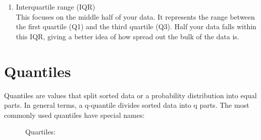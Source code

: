 \documentclass[
]{book}
\newenvironment{Shaded}{\begin{snugshade}}{\end{snugshade}}
\newcommand{\AttributeTok}[1]{\textcolor[rgb]{0.13,0.29,0.53}{#1}}
\newcommand{\CommentTok}[1]{\textcolor[rgb]{0.56,0.35,0.01}{\textit{#1}}}
\newcommand{\FunctionTok}[1]{\textcolor[rgb]{0.13,0.29,0.53}{\textbf{#1}}}
\newcommand{\NormalTok}[1]{#1}
\newcommand{\SpecialCharTok}[1]{\textcolor[rgb]{0.81,0.36,0.00}{\textbf{#1}}}
\newcommand{\StringTok}[1]{\textcolor[rgb]{0.31,0.60,0.02}{#1}}
\providecommand{\tightlist}{%
  \setlength{\itemsep}{0pt}\setlength{\parskip}{0pt}}
\begin{document}
\begin{Shaded}
\end{Shaded}

\begin{enumerate}
\def\labelenumi{\arabic{enumi}.}
\setcounter{enumi}{3}
\tightlist
\item
  Interquartile range (IQR)\\
  This focuses on the middle half of your data. It represents the range between the first quartile (Q1) and the third quartile (Q3). Half your data falls within this IQR, giving a better idea of how spread out the bulk of the data is.
\end{enumerate}

\begin{Shaded}
\end{Shaded}

\hypertarget{quantiles}{%
\section{Quantiles}\label{quantiles}}

Quantiles are values that split sorted data or a probability distribution into equal parts. In general terms, a q-quantile divides sorted data into q parts. The most commonly used quantiles have special names:

~~~~~~Quartiles:

\begin{Shaded}
\end{Shaded}
\end{document}
